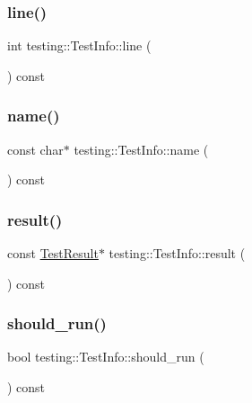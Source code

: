 \subsubsection{\texorpdfstring{line()}{line()}}
{\footnotesize\ttfamily int testing\+::\+Test\+Info\+::line (\begin{DoxyParamCaption}{ }\end{DoxyParamCaption}) const\hspace{0.3cm}{\ttfamily [inline]}}

\mbox{\label{classtesting_1_1_test_info_ac2581b45eccc9a3b94cb41c4807d0e34}} 
\subsubsection{\texorpdfstring{name()}{name()}}
{\footnotesize\ttfamily const char$\ast$ testing\+::\+Test\+Info\+::name (\begin{DoxyParamCaption}{ }\end{DoxyParamCaption}) const\hspace{0.3cm}{\ttfamily [inline]}}

\mbox{\label{classtesting_1_1_test_info_aee8cb884c95cd446129aba936b4159e0}} 
\subsubsection{\texorpdfstring{result()}{result()}}
{\footnotesize\ttfamily const \hyperlink{classtesting_1_1_test_result}{Test\+Result}$\ast$ testing\+::\+Test\+Info\+::result (\begin{DoxyParamCaption}{ }\end{DoxyParamCaption}) const\hspace{0.3cm}{\ttfamily [inline]}}

\mbox{\label{classtesting_1_1_test_info_a866e33b5bc5ab2a6e5375fc7d3af0f96}} 
\subsubsection{\texorpdfstring{should\+\_\+run()}{should\_run()}}
{\footnotesize\ttfamily bool testing\+::\+Test\+Info\+::should\+\_\+run (\begin{DoxyParamCaption}{ }\end{DoxyParamCaption}) const\hspace{0.3cm}{\ttfamily [inline]}}


